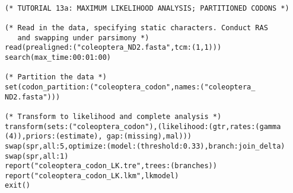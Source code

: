\begin{verbatim}

(* TUTORIAL 13a: MAXIMUM LIKELIHOOD ANALYSIS; PARTITIONED CODONS *) 

(* Read in the data, specifying static characters. Conduct RAS 
   and swapping under parsimony *)
read(prealigned:("coleoptera_ND2.fasta",tcm:(1,1)))
search(max_time:00:01:00)

(* Partition the data *)
set(codon_partition:("coleoptera_codon",names:("coleoptera_
ND2.fasta")))

(* Transform to likelihood and complete analysis *)
transform(sets:("coleoptera_codon"),(likelihood:(gtr,rates:(gamma
(4)),priors:(estimate), gap:(missing),mal)))
swap(spr,all:5,optimize:(model:(threshold:0.33),branch:join_delta)
swap(spr,all:1)
report("coleoptera_codon_LK.tre",trees:(branches))
report("coleoptera_codon_LK.lkm",lkmodel)
exit()
\end{verbatim}

